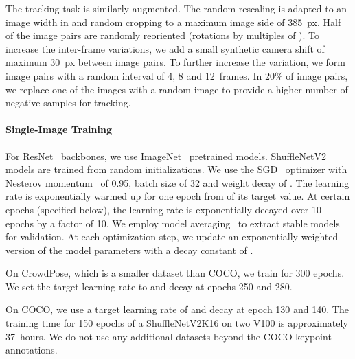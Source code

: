 \documentclass[journal]{IEEEtran}
\begin{document}
The tracking task is similarly augmented. The random rescaling is adapted
to an image width in 
and random cropping to a maximum image side of 385~px. Half of the image pairs
are randomly reoriented (rotations by multiples of ).
To increase the inter-frame variations, we add a small synthetic camera shift
of maximum 30~px between image pairs.
To further increase the variation, we form image pairs with a random interval of 4, 8 and
12~frames.
In 20\% of image pairs, we replace one of the images with a random image
to provide a higher number of negative samples for tracking.



\paragraph{Single-Image Training}
For ResNet~\cite{he2016deep} backbones, we use
ImageNet~\cite{deng2009imagenet} pretrained models.
ShuffleNetV2~\cite{ma2018shufflenet}
models are trained from random initializations.
We use the SGD~\cite{bottou2010large} optimizer with Nesterov
momentum~\cite{nesterov27method} of 0.95, batch size of 32 and weight decay of .
The learning rate is exponentially warmed
up for one epoch from  of its target value. At certain
epochs (specified below), the learning
rate is exponentially decayed over 10 epochs by a factor of 10.
We employ model averaging~\cite{polyak1992acceleration,ruppert1988efficient}
to extract stable models for validation. At each optimization
step, we update an exponentially weighted version of the model parameters with a decay
constant of .


On CrowdPose, which is a smaller dataset than COCO, we train for 300 epochs.
We set the target learning rate to  and
decay at epochs 250 and 280.

On COCO, we use a target learning rate of  and decay at epoch 130 and 140.
The training time for 150 epochs of a ShuffleNetV2K16 on two V100 is
approximately 37~hours.
We do not use any additional datasets beyond the COCO keypoint
annotations.
\end{document}
